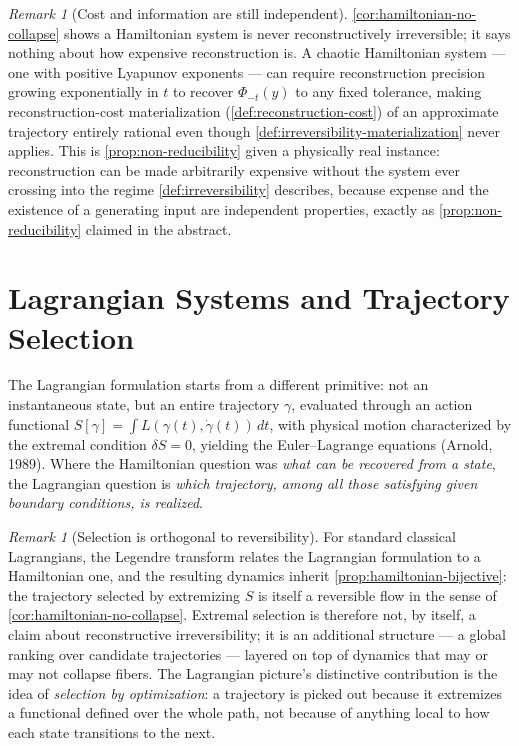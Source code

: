 \documentclass[11pt]{book}
\theoremstyle{plain}
\theoremstyle{definition}
\theoremstyle{remark}
\newtheorem{remark}[theorem]{Remark}
\begin{document}
\begin{remark}[Cost and information are still independent]
\label{rem:chaos-cost}
\cref{cor:hamiltonian-no-collapse} shows a Hamiltonian system is never
reconstructively irreversible; it says nothing about how expensive
reconstruction is. A chaotic Hamiltonian system --- one with positive
Lyapunov exponents --- can require reconstruction precision growing
exponentially in $t$ to recover $\Phi_{-t}(y)$ to any fixed tolerance,
making reconstruction-cost materialization
(\cref{def:reconstruction-cost}) of an approximate trajectory entirely
rational even though \cref{def:irreversibility-materialization} never
applies. This is \cref{prop:non-reducibility} given a physically real
instance: reconstruction can be made arbitrarily expensive without the
system ever crossing into the regime \cref{def:irreversibility}
describes, because expense and the existence of a generating input are
independent properties, exactly as \cref{prop:non-reducibility}
claimed in the abstract.
\end{remark}

\section{Lagrangian Systems and Trajectory Selection}

The Lagrangian formulation starts from a different primitive: not an
instantaneous state, but an entire trajectory $\gamma$, evaluated
through an action functional $S[\gamma] = \int L(\gamma(t),
\dot\gamma(t))\, dt$, with physical motion characterized by the
extremal condition $\delta S = 0$, yielding the Euler--Lagrange
equations (Arnold, 1989). Where the Hamiltonian question was
\emph{what can be recovered from a state}, the Lagrangian question is
\emph{which trajectory, among all those satisfying given boundary
conditions, is realized}.

\begin{remark}[Selection is orthogonal to reversibility]
\label{rem:lagrangian-orthogonal}
For standard classical Lagrangians, the Legendre transform relates the
Lagrangian formulation to a Hamiltonian one, and the resulting
dynamics inherit \cref{prop:hamiltonian-bijective}: the trajectory
selected by extremizing $S$ is itself a reversible flow in the sense
of \cref{cor:hamiltonian-no-collapse}. Extremal selection is therefore
not, by itself, a claim about reconstructive irreversibility; it is an
additional structure --- a global ranking over candidate trajectories
--- layered on top of dynamics that may or may not collapse fibers.
The Lagrangian picture's distinctive contribution is the idea of
\emph{selection by optimization}: a trajectory is picked out because
it extremizes a functional defined over the whole path, not because of
anything local to how each state transitions to the next.
\end{remark}
\end{document}
